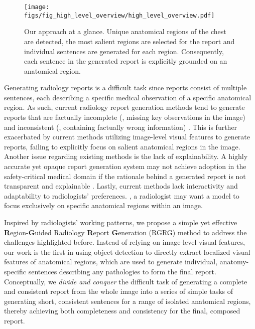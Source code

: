 \documentclass[10pt,twocolumn,letterpaper]{article}
\begin{document}
\begin{figure}[t]
  \centering
   \texttt{[image: figs/fig\_high\_level\_overview/high\_level\_overview.pdf]}
   \caption{Our approach at a glance. Unique anatomical regions of the chest are detected, the most salient regions are selected for the report and individual sentences are generated for each region. Consequently, each sentence in the generated report is explicitly grounded on an anatomical region.}
   \label{fig:high-level-overview}
\end{figure}

Generating radiology reports is a difficult task since reports consist of multiple sentences, each describing a specific medical observation of a specific anatomical region. As such, current radiology report generation methods tend to generate reports that are factually incomplete (\ie, missing key observations in the image) and inconsistent (\ie, containing factually wrong information) \cite{miura2021improving}. This is further exacerbated by current methods utilizing image-level visual features to generate reports, failing to explicitly focus on salient anatomical regions in the image. Another issue regarding existing methods is the lack of explainability. A highly accurate yet opaque report generation system may not achieve adoption in the safety-critical medical domain if the rationale behind a generated report is not transparent and explainable \cite{guidotti2018survey, miller2019explanation, geis2019ethics}. 
Lastly, current methods lack interactivity and adaptability to radiologists' preferences. \Eg, a radiologist may want a model to focus exclusively on specific anatomical regions within an image.

Inspired by radiologists' working patterns, we propose a simple yet effective \textbf{R}egion-\textbf{G}uided Radiology \textbf{R}eport \textbf{G}eneration (RGRG) method to address the challenges highlighted before. Instead of relying on image-level visual features, our work is the first in using object detection to directly extract localized visual features of anatomical regions, which are used to generate individual, anatomy-specific sentences describing any pathologies to form the final report. Conceptually, we \textit{divide and conquer} the difficult task of generating a complete and consistent report from the whole image into a series of simple tasks of generating short, consistent sentences for a range of isolated anatomical regions, thereby achieving both completeness and consistency for the final, composed report.
\end{document}
